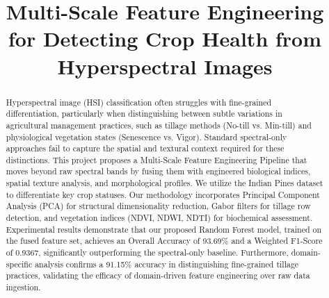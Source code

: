 \documentclass[conference]{IEEEtran}
\begin{document}
\title{Multi-Scale Feature Engineering for Detecting Crop Health from Hyperspectral Images}

\author{
\and
{}
\and
{}
}

\maketitle

\begin{abstract}
Hyperspectral image (HSI) classification often struggles with fine-grained differentiation, particularly when distinguishing between subtle variations in agricultural management practices, such as tillage methods (No-till vs. Min-till) and physiological vegetation states (Senescence vs. Vigor). Standard spectral-only approaches fail to capture the spatial and textural context required for these distinctions. This project proposes a Multi-Scale Feature Engineering Pipeline that moves beyond raw spectral bands by fusing them with engineered biological indices, spatial texture analysis, and morphological profiles. We utilize the Indian Pines dataset to differentiate key crop statuses. Our methodology incorporates Principal Component Analysis (PCA) for structural dimensionality reduction, Gabor filters for tillage row detection, and vegetation indices (NDVI, NDWI, NDTI) for biochemical assessment. Experimental results demonstrate that our proposed Random Forest model, trained on the fused feature set, achieves an Overall Accuracy of 93.69\% and a Weighted F1-Score of 0.9367, significantly outperforming the spectral-only baseline. Furthermore, domain-specific analysis confirms a 91.15\% accuracy in distinguishing fine-grained tillage practices, validating the efficacy of domain-driven feature engineering over raw data ingestion.
\end{abstract}
\end{document}
